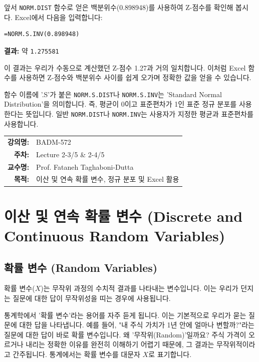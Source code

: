 \documentclass[11pt,a4paper]{book}
\makeatletter
\theoremstyle{definition}
\newcommand{\metainfo}[4]{
\begin{tcolorbox}[
    colback=lightpurple,
    colframe=darkpurple,
    boxrule=1pt,
    arc=2mm,
    left=10pt,
    right=10pt,
    top=8pt,
    bottom=8pt
]
\begin{tabular}{@{}rl@{}}
\textbf{강의명:} & #1 \\[0.3em]
\textbf{주차:} & #2 \\[0.3em]
\textbf{교수명:} & #3 \\[0.3em]
\textbf{목적:} & \begin{minipage}[t]{0.75\textwidth}#4\end{minipage}
\end{tabular}
\end{tcolorbox}
}
\makeatother
\begin{document}
\begin{examplebox}[title=NORM.S.INV 함수 적용]
앞서 \texttt{NORM.DIST} 함수로 얻은 백분위수(0.898948)를 사용하여 Z-점수를 확인해 봅시다.
Excel에서 다음을 입력합니다:
\begin{lstlisting}[language=Excel, caption={NORM.S.INV 함수를 이용한 Z-점수 확인}, label={lst:norm_s_inv_example}]
=NORM.S.INV(0.898948)
\end{lstlisting}
\textbf{결과:} 약 \texttt{1.275581}

이 결과는 우리가 수동으로 계산했던 Z-점수 1.27과 거의 일치합니다. 이처럼 Excel 함수를 사용하면 Z-점수와 백분위수 사이를 쉽게 오가며 정확한 값을 얻을 수 있습니다.

\begin{infobox}[title=NORM.S.DIST와 NORM.S.INV의 'S' 의미]
함수 이름에 '.S'가 붙은 \texttt{NORM.S.DIST}나 \texttt{NORM.S.INV}는 'Standard Normal Distribution'을 의미합니다. 즉, 평균이 0이고 표준편차가 1인 표준 정규 분포를 사용한다는 뜻입니다. 일반 \texttt{NORM.DIST}나 \texttt{NORM.INV}는 사용자가 지정한 평균과 표준편차를 사용합니다.
\end{infobox}
\end{examplebox}


\metainfo{BADM-572}{Lecture 2-3/5 \& 2-4/5}{Prof. Fataneh Taghaboni-Dutta}{이산 및 연속 확률 변수, 정규 분포 및 Excel 활용}


\section{이산 및 연속 확률 변수 (Discrete and Continuous Random Variables)}

\subsection{확률 변수 (Random Variables)}

\begin{summarybox}[title={확률 변수 핵심 요약}]
확률 변수(\(X\))는 무작위 과정의 수치적 결과를 나타내는 변수입니다. 이는 우리가 던지는 질문에 대한 답이 무작위성을 띠는 경우에 사용됩니다.
\end{summarybox}

통계학에서 '확률 변수'라는 용어를 자주 듣게 됩니다. 이는 기본적으로 우리가 묻는 질문에 대한 답을 나타냅니다. 예를 들어, "내 주식 가치가 1년 안에 얼마나 변할까?"라는 질문에 대한 답이 바로 확률 변수입니다. 왜 '무작위(Random)'일까요? 주식 가격이 오르거나 내리는 정확한 이유를 완전히 이해하기 어렵기 때문에, 그 결과는 무작위적이라고 간주됩니다. 통계에서는 확률 변수를 대문자 \(X\)로 표기합니다.
\end{document}

